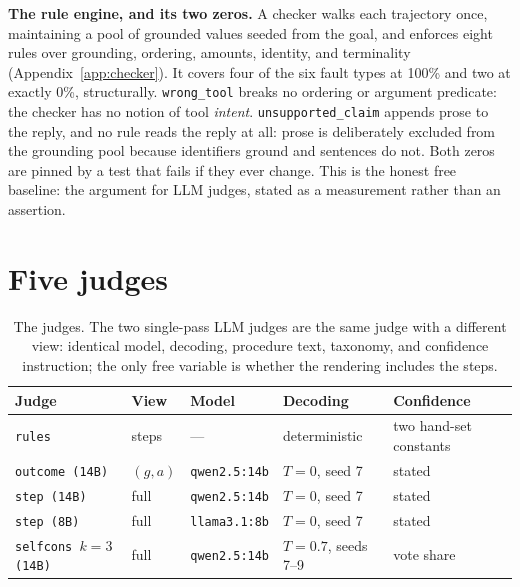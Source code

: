 \documentclass{article}
\newcommand{\ftype}[1]{\texttt{#1}}
\newcommand{\judge}[1]{\texttt{#1}}
\begin{document}
\textbf{The rule engine, and its two zeros.} A checker walks each trajectory once,
maintaining a pool of grounded values seeded from the goal, and enforces eight rules over
grounding, ordering, amounts, identity, and terminality (Appendix~\ref{app:checker}). It
covers four of the six fault types at 100\% and two at exactly 0\%, structurally.
\ftype{wrong\_tool} breaks no ordering or argument predicate: the checker has no notion of
tool \emph{intent}. \ftype{unsupported\_claim} appends prose to the reply, and no rule reads
the reply at all: prose is deliberately excluded from the grounding pool because identifiers
ground and sentences do not. Both zeros are pinned by a test that fails if they ever change.
This is the honest free baseline: the argument for LLM judges, stated as a measurement rather
than an assertion.

\section{Five judges}
\label{sec:judges}

\begin{table}[t]
\centering
\caption{The judges. The two single-pass LLM judges are the same judge with a different view:
identical model, decoding, procedure text, taxonomy, and confidence instruction; the only
free variable is whether the rendering includes the steps.}
\label{tab:judges}
\small
\begin{tabular}{@{}lllll@{}}
\toprule
Judge & View & Model & Decoding & Confidence \\
\midrule
\judge{rules} & steps & --- & deterministic & two hand-set constants \\
\judge{outcome (14B)} & $(g,a)$ & \texttt{qwen2.5:14b} & $T{=}0$, seed 7 & stated \\
\judge{step (14B)} & full & \texttt{qwen2.5:14b} & $T{=}0$, seed 7 & stated \\
\judge{step (8B)} & full & \texttt{llama3.1:8b} & $T{=}0$, seed 7 & stated \\
\judge{selfcons $k{=}3$ (14B)} & full & \texttt{qwen2.5:14b} & $T{=}0.7$, seeds 7--9 & vote share \\
\bottomrule
\end{tabular}
\end{table}
\end{document}

